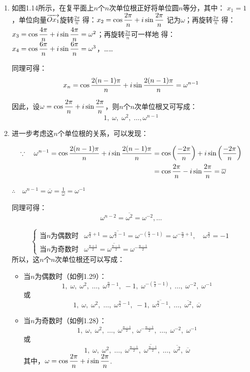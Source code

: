 \begin{enumerate}
\item 如图1.14所示，在复平面上$n$个$n$次单位根正好将单位圆$n$等分，其中：
$x_1=1$，单位向量$\overrightarrow{Ox_1}$旋转$\frac{2\pi}{n}$
得：$x_2=\cos{\dfrac{2\pi}{n}}+i\sin{\dfrac{2\pi}{n}}$
记为$\omega$；再旋转$\frac{2\pi}{n}$
得：$x_3=\cos{\dfrac{4\pi}{n}}+i\sin{\dfrac{4\pi}{n}}=\omega^2$；再旋转$\frac{2\pi}{n}$可一样地
得：$x_4=\cos{\dfrac{6\pi}{n}}+i\sin{\dfrac{6\pi}{n}}=\omega^3$，……

同理可得：
\[x_n=\cos{\dfrac{2(n-1)\pi}{n}}+i\sin{\dfrac{2(n-1)\pi}{n}}=\omega^{n-1}\]

因此，设$\omega=\cos{\dfrac{2\pi}{n}}+i\sin{\dfrac{2\pi}{n}}$，则$n$个$n$次单位根又可写成：
\[1,\; \omega,\; \omega^2,\; \ldots, \omega^{n-1}\]

\item 进一步考虑这$n$个单位根的关系，可以发现：

\[\begin{split}
    \because\quad \omega^{n-1}=\cos{\dfrac{2(n-1)\pi}{n}}+i\sin{\dfrac{2(n-1)\pi}{n}}&=\cos\left(\dfrac{-2\pi}{n}\right)+i\sin\left(\dfrac{-2\pi}{n}\right)\\
    &=\cos\dfrac{2\pi}{n}-i\sin\dfrac{2\pi}{n}=\overline{\omega}
\end{split}\]

$\therefore\quad \omega^{n-1}=\overline{\omega}=\frac{1}{\omega}=\omega^{-1}$

同理可得：\[\omega^{n-2}=\overline{\omega^2}=\omega^{-2},\ldots\]

\[\begin{cases}
\text{当$n$为偶数时}& \omega^{\tfrac{n}{2}+1}=\overline{\omega^{\tfrac{n}{2}-1}}=\omega^{-\left(\tfrac{n}{2}-1\right)}=\omega^{-\tfrac{n}{2}+1},\quad \omega^{\tfrac{n}{2}}=-1\\
\text{当$n$为奇数时}& \omega^{\tfrac{n+1}{2}}=\overline{\omega^{\tfrac{n-1}{2}}}=\omega^{-\tfrac{n-1}{2}}
\end{cases}\]
所以，这$n$个$n$次单位根还可以写成：
\begin{itemize}
    \item 当$n$为偶数时（如例1.29）：
\[1,\; \omega,\; \omega^2,\;\ldots,\;  \omega^{\tfrac{n}{2}-1},\;-1,\;  \omega^{-\left(\tfrac{n}{2}-1\right)},\; \ldots, \;  \omega^{-2},\; \omega^{-1}\]
或
\[1,\; \omega,\; \omega^2,\;\ldots,\;  \omega^{\tfrac{n}{2}-1},\;-1,\;  \overline{\omega^{\tfrac{n}{2}-1}},\; \ldots, \;  \overline{\omega^{2}},\; \overline{\omega}\]

\item 当$n$为奇数时（如例1.28）：
\[1,\; \omega,\; \omega^2,\;\ldots,\;  \omega^{\tfrac{n-1}{2}},\;  \omega^{-\tfrac{n-1}{2}},\; \ldots, \;  \omega^{-2},\; \omega^{-1}\]
或
\[1,\; \omega,\; \omega^2,\;\ldots,\;  \omega^{\tfrac{n-1}{2}},\;  \overline{\omega^{\tfrac{n-1}{2}}},\; \ldots, \;  \overline{\omega^{2}},\; \overline{\omega}\]
其中，$\omega=\cos{\dfrac{2\pi}{n}}+i\sin{\dfrac{2\pi}{n}}$.
\end{itemize}


\end{enumerate}
